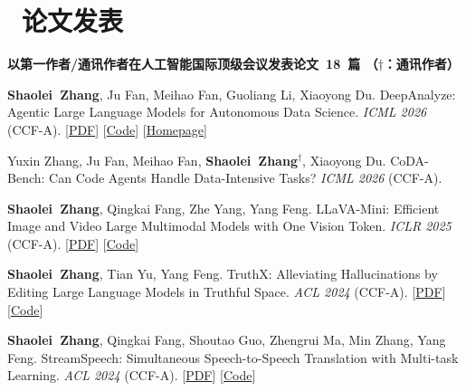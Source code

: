 \documentclass{resume}
\begin{document}
\section{\textcolor{red1}{\faBook\ 论文发表}}
\large\textbf{以第一作者/通讯作者在人工智能国际顶级会议发表论文\ \textcolor{red2}{18}\ 篇 （$\dagger$：通讯作者）}
\fontsize{9pt}{9.7pt}\selectfont
\begin{enumerate}[label={[\arabic*]},parsep=0ex]
    \item \textbf{Shaolei\ Zhang}, Ju Fan, Meihao Fan, Guoliang Li, Xiaoyong Du. DeepAnalyze: Agentic Large Language Models for Autonomous Data Science. \textit{ICML 2026} (\textcolor{red2}{CCF-A}). [\href{https://arxiv.org/pdf/2510.16872}{PDF}] [\href{https://github.com/ruc-datalab/DeepAnalyze}{Code}] [\href{https://ruc-deepanalyze.github.io/}{Homepage}]

    \item Yuxin Zhang, Ju Fan, Meihao Fan, \textbf{Shaolei\ Zhang}$^\dagger$, Xiaoyong Du. CoDA-Bench: Can Code Agents Handle Data-Intensive Tasks? \textit{ICML 2026} (\textcolor{red2}{CCF-A}).

    \item \textbf{Shaolei\ Zhang}, Qingkai Fang, Zhe Yang, Yang Feng. LLaVA-Mini: Efficient Image and Video Large Multimodal Models with One Vision Token. \textit{ICLR 2025} (\textcolor{red2}{CCF-A}). [\href{https://arxiv.org/pdf/2501.03895}{PDF}] [\href{https://github.com/ictnlp/LLaVA-Mini}{Code}]

    \item \textbf{Shaolei\ Zhang}, Tian Yu, Yang Feng. TruthX: Alleviating Hallucinations by Editing Large Language Models in Truthful Space. \textit{ACL 2024} (\textcolor{red2}{CCF-A}). [\href{https://arxiv.org/pdf/2402.17811.pdf}{PDF}] [\href{https://github.com/ictnlp/TruthX}{Code}]

    \item \textbf{Shaolei\ Zhang}, Qingkai Fang, Shoutao Guo, Zhengrui Ma, Min Zhang, Yang Feng. StreamSpeech: Simultaneous Speech-to-Speech Translation with Multi-task Learning. \textit{ACL 2024} (\textcolor{red2}{CCF-A}). [\href{https://arxiv.org/pdf/2406.03049.pdf}{PDF}] [\href{https://github.com/ictnlp/StreamSpeech}{Code}]


\end{enumerate}
\end{document}
